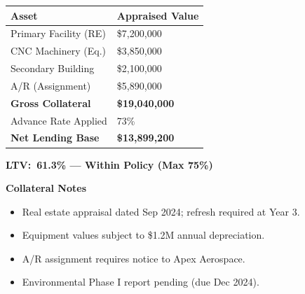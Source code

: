 \documentclass[11pt,a4paper]{article}
\begin{document}
\noindent
\begin{minipage}[t]{0.55\textwidth}
  \vspace{0pt}
  \begin{tcolorbox}[goldbox, title={\faBuilding\enspace Collateral Schedule}]
    \small
    \renewcommand{\arraystretch}{1.25}
    \begin{tabular}{@{} L{3.4cm} R{2.4cm} @{}}
      \textbf{Asset} & \textbf{Appraised Value} \\
      \midrule
      Primary Facility (RE)    & \$7,200,000 \\
      CNC Machinery (Eq.)      & \$3,850,000 \\
      Secondary Building       & \$2,100,000 \\
      A/R (Assignment)         & \$5,890,000 \\
      \midrule
      \textbf{Gross Collateral}& \textbf{\$19,040,000} \\
      Advance Rate Applied     & 73\%         \\
      \textbf{Net Lending Base}& \textbf{\$13,899,200} \\
    \end{tabular}
    \vspace{4pt}
    {\color{GreenOK}\scriptsize\bfseries LTV:\ 61.3\% — Within Policy (Max 75\%)}
  \end{tcolorbox}
\end{minipage}%
\hfill
\begin{minipage}[t]{0.41\textwidth}
  \vspace{0pt}
  \begin{tcolorbox}[alertbox, title={}]
    {\color{AlertRed}\bfseries\small\faExclamationTriangle\enspace Collateral Notes}
    \vspace{4pt}

    \begin{itemize}[leftmargin=14pt, itemsep=2pt, topsep=2pt]
      \item[\textcolor{AlertRed}{\textbullet}] Real estate appraisal dated Sep 2024; refresh required at Year 3.
      \item[\textcolor{AlertRed}{\textbullet}] Equipment values subject to \$1.2M annual depreciation.
      \item[\textcolor{AlertRed}{\textbullet}] A/R assignment requires notice to Apex Aerospace.
      \item[\textcolor{AlertRed}{\textbullet}] Environmental Phase I report pending (due Dec 2024).
    \end{itemize}
  \end{tcolorbox}
\end{minipage}
\end{document}
